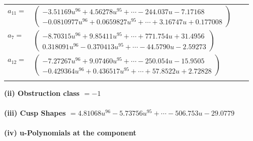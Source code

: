 \documentclass[1p]{elsarticle_modified}
\theoremstyle{definition}
\begin{document}
\begin{tabular}{m{7pt} m{180pt} m{7pt} m{180pt} }
\flushright $a_{11}=$&$\begin{pmatrix}-3.51169 u^{96}+4.56278 u^{95}+\cdots-244.037 u-7.17168\\-0.0810977 u^{96}+0.0659827 u^{95}+\cdots+3.16747 u+0.177008\end{pmatrix}$ \\
\flushright $a_{7}=$&$\begin{pmatrix}-8.70315 u^{96}+9.85411 u^{95}+\cdots+771.754 u+31.4956\\0.318091 u^{96}-0.370413 u^{95}+\cdots-44.5790 u-2.59273\end{pmatrix}$ \\
\flushright $a_{12}=$&$\begin{pmatrix}-7.27267 u^{96}+9.07460 u^{95}+\cdots-250.054 u-15.9505\\-0.429364 u^{96}+0.436517 u^{95}+\cdots+57.8522 u+2.72828\end{pmatrix}$\\&\end{tabular}
\flushleft \textbf{(ii) Obstruction class $= -1$}\\~\\
\flushleft \textbf{(iii) Cusp Shapes $= 4.81068 u^{96}-5.73756 u^{95}+\cdots-506.753 u-29.0779$}\\~\\
\newpage\renewcommand{\arraystretch}{1}
\flushleft \textbf{(iv) u-Polynomials at the component}\newline \\
\end{document}
